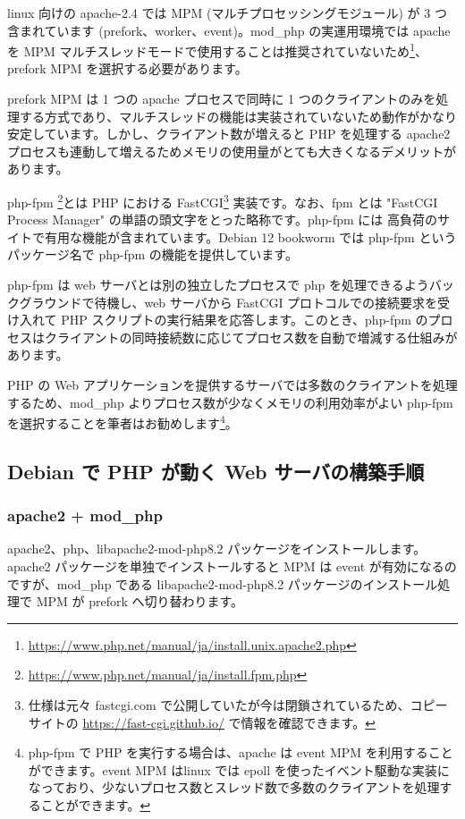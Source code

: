 \documentclass[mingoth,a4paper]{jsarticle}
\begin{document}
linux 向けの apache-2.4 では MPM (マルチプロセッシングモジュール) が 3 つ含まれています (prefork、worker、event)。mod\_php の実運用環境では apache を MPM マルチスレッドモードで使用することは推奨されていないため\footnote{\url{https://www.php.net/manual/ja/install.unix.apache2.php}}、prefork MPM を選択する必要があります。

prefork MPM は 1 つの apache プロセスで同時に 1 つのクライアントのみを処理する方式であり、マルチスレッドの機能は実装されていないため動作がかなり安定しています。しかし、クライアント数が増えると PHP を処理する apache2 プロセスも連動して増えるためメモリの使用量がとても大きくなるデメリットがあります。


php-fpm \footnote{\url{https://www.php.net/manual/ja/install.fpm.php}}とは PHP における FastCGI\footnote{仕様は元々 fastcgi.com で公開していたが今は閉鎖されているため、コピーサイトの \url{https://fast-cgi.github.io/} で情報を確認できます。} 実装です。なお、fpm とは "FastCGI Process Manager" の単語の頭文字をとった略称です。php-fpm には 高負荷のサイトで有用な機能が含まれています。Debian 12 bookworm では php-fpm というパッケージ名で php-fpm の機能を提供しています。


php-fpm は web サーバとは別の独立したプロセスで php を処理できるようバックグラウンドで待機し、web サーバから FastCGI プロトコルでの接続要求を受け入れて PHP スクリプトの実行結果を応答します。このとき、php-fpm のプロセスはクライアントの同時接続数に応じてプロセス数を自動で増減する仕組みがあります。

PHP の Web アプリケーションを提供するサーバでは多数のクライアントを処理するため、mod\_php よりプロセス数が少なくメモリの利用効率がよい php-fpm を選択することを筆者はお勧めします\footnote{php-fpm で PHP を実行する場合は、apache は event MPM を利用することができます。event MPM はlinux では epoll を使ったイベント駆動な実装になっており、少ないプロセス数とスレッド数で多数のクライアントを処理することができます。}。


\subsection{Debian で PHP が動く Web サーバの構築手順}

\subsubsection{apache2 + mod\_php}

apache2、php、libapache2-mod-php8.2 パッケージをインストールします。
apache2 パッケージを単独でインストールすると MPM は event が有効になるのですが、mod\_php である libapache2-mod-php8.2 パッケージのインストール処理で MPM が prefork へ切り替わります。
\end{document}
